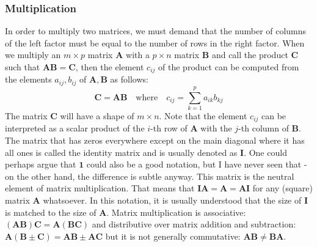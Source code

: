 \subsubsection{Multiplication} In order to multiply two matrices, we must demand that the number of columns of the left factor must be equal to the number of rows in the right factor. When we multiply an $m \times p$ matrix $\mathbf{A}$ with a $p \times n$ matrix $\mathbf{B}$ and call the product $\mathbf{C}$ such that $\mathbf{A} \mathbf{B} = \mathbf{C}$, then the element $c_{ij}$ of the product can be computed from the elements $a_{ij}, b_{ij}$ of $\mathbf{A}, \mathbf{B}$ as follows:
\begin{equation}
 \mathbf{C} = \mathbf{A} \mathbf{B} 
 \quad \text{where} \quad
 c_{ij} = \sum_{k=1}^p a_{ik} b_{kj}
\end{equation}
The matrix $\mathbf{C}$ will have a shape of $m \times n$. Note that the element $c_{ij}$ can be interpreted as a scalar product of the $i$-th row of $\mathbf{A}$ with the $j$-th column of  $\mathbf{B}$. The matrix that has zeros everywhere except on the main diagonal where it has all ones is called the identity matrix and is usually denoted as $\mathbf{I}$. One could perhaps argue that $\mathbf{1}$ could also be a good notation, but I have never seen that - on the other hand, the difference is subtle anyway. This matrix is the neutral element of matrix multiplication. That means that  $\mathbf{I} \mathbf{A} = \mathbf{A} = \mathbf{A} \mathbf{I}$ for any (square) matrix $\mathbf{A}$ whatsoever. In this notation, it is usually understood that the size of $\mathbf{I}$ is matched to the size of $\mathbf{A}$. Matrix multiplication is associative: $(\mathbf{A} \mathbf{B}) \mathbf{C} = \mathbf{A} (\mathbf{B} \mathbf{C})$ and distributive over matrix addition and subtraction: $\mathbf{A} (\mathbf{B} \pm \mathbf{C}) = \mathbf{A} \mathbf{B} \pm \mathbf{A} \mathbf{C}$ but it is not generally commutative: $\mathbf{AB} \neq \mathbf{BA}$. 




